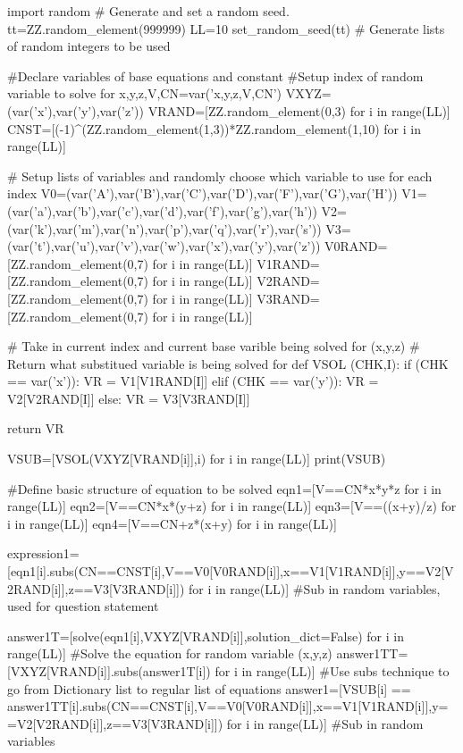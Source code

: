 \documentclass{article}%
\begin{document}
\begin{sagesilent}
import random
# Generate and set a random seed.
tt=ZZ.random_element(999999)
LL=10
set_random_seed(tt)
# Generate lists of random integers to be used

#Declare variables of base equations and constant
#Setup index of random variable to solve for
x,y,z,V,CN=var('x,y,z,V,CN')
VXYZ=(var('x'),var('y'),var('z'))
VRAND=[ZZ.random_element(0,3) for i in range(LL)]
CNST=[(-1)^(ZZ.random_element(1,3))*ZZ.random_element(1,10) for i in range(LL)]

# Setup lists of variables and randomly choose which variable to use for each index 
V0=(var('A'),var('B'),var('C'),var('D'),var('F'),var('G'),var('H'))
V1=(var('a'),var('b'),var('c'),var('d'),var('f'),var('g'),var('h'))
V2=(var('k'),var('m'),var('n'),var('p'),var('q'),var('r'),var('s'))
V3=(var('t'),var('u'),var('v'),var('w'),var('x'),var('y'),var('z'))
V0RAND=[ZZ.random_element(0,7) for i in range(LL)]
V1RAND=[ZZ.random_element(0,7) for i in range(LL)]
V2RAND=[ZZ.random_element(0,7) for i in range(LL)]
V3RAND=[ZZ.random_element(0,7) for i in range(LL)]


# Take in current index and current base varible being solved for (x,y,z)
# Return what substitued variable is being solved for 
def VSOL (CHK,I):
  if (CHK == var('x')):
    VR = V1[V1RAND[I]]
  elif (CHK == var('y')):
    VR = V2[V2RAND[I]]
  else:
    VR = V3[V3RAND[I]]
    
  return VR

VSUB=[VSOL(VXYZ[VRAND[i]],i) for i in range(LL)]
print(VSUB)


#Define basic structure of equation to be solved
eqn1=[V==CN*x*y*z for i in range(LL)]
eqn2=[V==CN*x*(y+z) for i in range(LL)]
eqn3=[V==((x+y)/z) for i in range(LL)]
eqn4=[V==CN+z*(x+y) for i in range(LL)]



expression1=[eqn1[i].subs(CN==CNST[i],V==V0[V0RAND[i]],x==V1[V1RAND[i]],y==V2[V2RAND[i]],z==V3[V3RAND[i]]) for i in range(LL)] #Sub in random variables, used for question statement

answer1T=[solve(eqn1[i],VXYZ[VRAND[i]],solution_dict=False) for i in range(LL)]  #Solve the equation for random variable (x,y,z)
answer1TT=[VXYZ[VRAND[i]].subs(answer1T[i]) for i in range(LL)]                  #Use subs technique to go from Dictionary list to regular list of equations  
answer1=[VSUB[i] == answer1TT[i].subs(CN==CNST[i],V==V0[V0RAND[i]],x==V1[V1RAND[i]],y==V2[V2RAND[i]],z==V3[V3RAND[i]]) for i in range(LL)]   #Sub in  random variables




\end{sagesilent}
\end{document}
